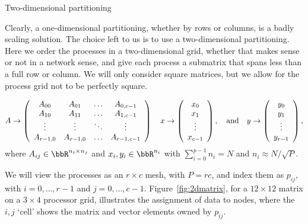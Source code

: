  {Two-dimensional partitioning}
\label{sec:mvp-2d}

Clearly, a one-dimensional partitioning, whether by rows or columns,
is a badly scaling solution.
The choice left to us is to use a two-dimensional partitioning.
Here we order the processes in a two-dimensional grid,
whether that makes sense or not in a network sense,
and give each process a submatrix that spans less than a full row or column.
We will only consider square matrices, but we allow for the process grid
not to be perfectly square.

\[
A \rightarrow \left( \begin{array}{c c c c} A_{00} & A_{01} & \ldots & A_{0,c-1} \\ A_{10} & A_{11} & \ldots & A_{1,c-1} \\ \vdots & \vdots & \ddots & \vdots \\ A_{r-1,0} & A_{r-1,0} & \ldots & A_{r-1,c-1} \\ \end{array} \right)
\quad
x \rightarrow \left( \begin{array}{c} x_0 \\ x_1 \\ \vdots \\ x_{c-1} \end{array} \right) ,
\quad
\mbox{and}
\quad
y \rightarrow \left( \begin{array}{c} y_0 \\ y_1 \\ \vdots \\ y_{r-1} \end{array} \right) ,
\]
where $ A_{ij} \in \bbR^{n_i \times n_j} $ and $ x_i, y_i \in \bbR^{n_i} $ with
$ \sum_{i=0}^{p-1} n_i = N $ and $ n_i \approx N / \sqrt P $.

We will view the processes as an $ r \times c $ mesh, with $ P = r c $,
and index them as $p_{ij}$, 
%
with $ i=0, \ldots, r-1 $ and $ j = 0,\ldots, c-1 $.
%
Figure~\ref{fig:2dmatrix}, for a $12\times12$ matrix
on a $3\times4$ processor grid,
illustrates the assignment of data to nodes, where the $ i,j$
`cell' shows the matrix and vector elements owned by  $ p_{ij} $.

